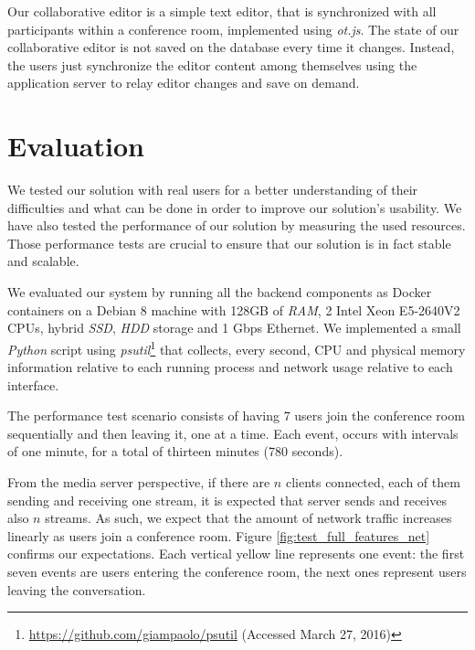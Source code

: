 \documentclass[10pt,conference]{IEEEtran}
\begin{document}
Our collaborative editor is a simple text editor, that is synchronized with all participants within a conference room, implemented using \emph{ot.js}.
The state of our collaborative editor is not saved on the database every time it changes.
Instead, the users just synchronize the editor content among themselves using the application server to relay editor changes and save on demand.



\section{Evaluation}
\label{chapter:evaluation}


We tested our solution with real users for a better understanding of their difficulties and what can be done in order to improve our solution's usability.
We have also tested the performance of our solution by measuring the used resources.
Those performance tests are crucial to ensure that our solution is in fact stable and scalable.

We evaluated our system by running all the backend components as Docker containers on a Debian 8 machine with 128GB of \emph{RAM}, 2 Intel Xeon E5-2640V2 CPUs, hybrid \emph{SSD}, \emph{HDD} storage and 1 Gbps Ethernet. 
We implemented a small \emph{Python} script using \emph{psutil}\footnote{\url{https://github.com/giampaolo/psutil} (Accessed March 27, 2016)} that collects, every second, CPU and physical memory information relative to each running process and network usage relative to each interface. 

The performance test scenario consists of having 7 users join the conference room sequentially and then leaving it, one at a time.
Each event, occurs with intervals of one minute, for a total of thirteen minutes (780 seconds).
  
From the media server perspective, if there are $n$ clients connected, each of them sending and receiving one stream, it is expected that server sends and receives also $n$ streams.
As such, we expect that the amount of network traffic increases linearly as users join a conference room.
Figure \ref{fig:test_full_features_net} confirms our expectations.
Each vertical yellow line represents one event: the first seven events are users entering the conference room, the next ones represent users leaving the conversation. 
     
\end{document}
